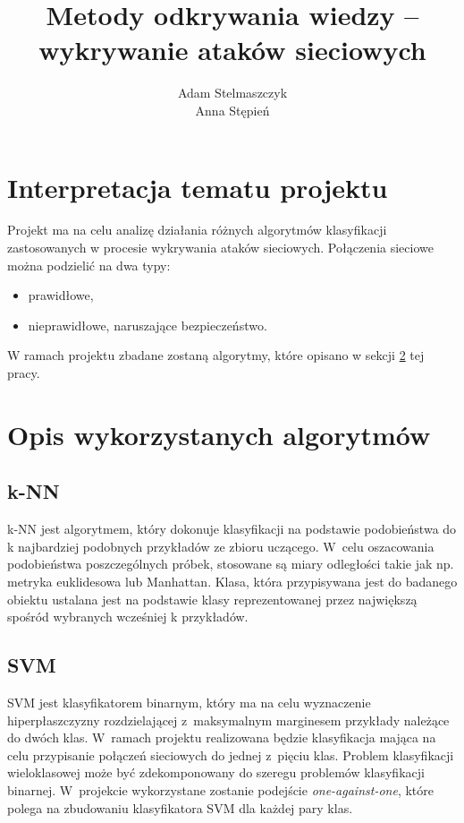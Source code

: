 \documentclass[a4paper, 12pt]{article}
\title{Metody odkrywania wiedzy -- wykrywanie ataków sieciowych}
\author{Adam Stelmaszczyk\\ Anna Stępień}
\begin{document}
\maketitle

\tableofcontents

\newpage

\section{Interpretacja tematu projektu}
Projekt ma na celu analizę działania różnych algorytmów klasyfikacji zastosowanych
w procesie wykrywania ataków sieciowych. Połączenia sieciowe można podzielić na dwa typy:
\begin{itemize}
	\item prawidłowe,
	\item nieprawidłowe, naruszające bezpieczeństwo.
\end{itemize}
W ramach projektu zbadane zostaną algorytmy, które opisano w sekcji \ref{algorithms} 
tej pracy.

\section{Opis wykorzystanych algorytmów}\label{algorithms}

\subsection{k-NN}
k-NN jest algorytmem, który dokonuje klasyfikacji na podstawie podobieństwa do k najbardziej podobnych przykładów ze zbioru uczącego. W~celu oszacowania podobieństwa poszczególnych próbek, stosowane są miary odległości takie jak np. metryka euklidesowa lub Manhattan. Klasa, która przypisywana jest do badanego obiektu ustalana jest na podstawie klasy reprezentowanej przez największą spośród wybranych wcześniej k przykładów.

\subsection{SVM}
SVM jest klasyfikatorem binarnym, który ma na celu wyznaczenie hiperpłaszczyzny rozdzielającej z~maksymalnym marginesem przykłady należące do dwóch klas. W~ramach projektu realizowana będzie klasyfikacja mająca na celu przypisanie połączeń sieciowych do jednej z~pięciu klas. Problem klasyfikacji wieloklasowej może być zdekomponowany do szeregu problemów klasyfikacji binarnej. W~projekcie wykorzystane zostanie podejście \textit{one-against-one}, które polega na zbudowaniu klasyfikatora SVM dla każdej pary klas.
\end{document}
